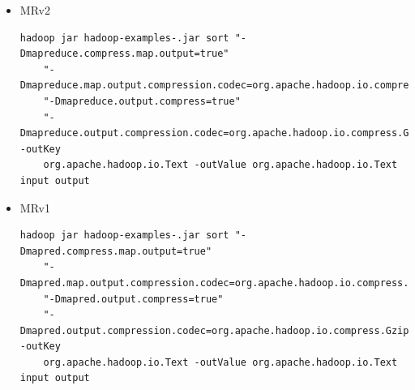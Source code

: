 \documentclass[a4paper,10pt]{article}
\begin{document}
\begin{itemize}
\begin{itemize}
	\item MRv2
	
	\lstset{language=Bash, breaklines=true, basicstyle=\footnotesize}
	\begin{lstlisting}[frame=single]
	hadoop jar hadoop-examples-.jar sort "-Dmapreduce.compress.map.output=true"
	"-Dmapreduce.map.output.compression.codec=org.apache.hadoop.io.compress.GzipCodec"
	"-Dmapreduce.output.compress=true"
	"-Dmapreduce.output.compression.codec=org.apache.hadoop.io.compress.GzipCodec" -outKey
	org.apache.hadoop.io.Text -outValue org.apache.hadoop.io.Text input output
	\end{lstlisting}
	
	\item MRv1

	\lstset{language=Bash, breaklines=true, basicstyle=\footnotesize}
	\begin{lstlisting}[frame=single]
	hadoop jar hadoop-examples-.jar sort "-Dmapred.compress.map.output=true"
	"-Dmapred.map.output.compression.codec=org.apache.hadoop.io.compress.GzipCodec"
	"-Dmapred.output.compress=true"
	"-Dmapred.output.compression.codec=org.apache.hadoop.io.compress.GzipCodec" -outKey
	org.apache.hadoop.io.Text -outValue org.apache.hadoop.io.Text input output
	\end{lstlisting}
	
\end{itemize}
\end{itemize}
\end{document}
